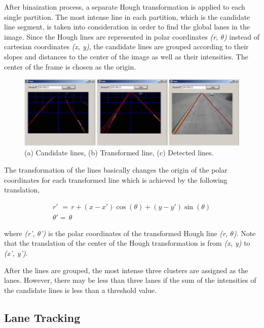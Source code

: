 \documentclass[a4paper,oneside,10pt]{article}
\begin{document}
After binaization process, a separate Hough transformation is applied to each single partition. The most intense line in each partition, which is the candidate line segment, is taken into consideration in order to find the global lanes in the image. Since the Hough lines are represented in polar coordinates \textit{(r, $\theta $)} instead of cartesian coordinates \textit{(x, y)}, the candidate lines are grouped according to their slopes and distances to the center of the image as well as their intensities. The center of the frame is chosen as the origin. 

\begin{figure}
\begin{center}
\includegraphics[scale=0.5]{fig2}
\end{center}
\caption{(a) Candidate lines, (b) Transformed line, (c) Detected lines.}
\label{aba:fig2}
\end{figure} 

The transformation of the lines basically changes the origin of the polar coordinates for each transformed line which is achieved by the following translation,

\begin{equation} \label{GrindEQ__1_} 
\begin{array}{l} {r'\, \, =\, r+(x-x')\cos (\theta )+(y-y')\sin (\theta )} \\ {\theta '=\, \theta } \end{array} 
\end{equation} 


\noindent where \textit{(r', $\theta $')} is the polar coordinates of the transformed Hough line \textit{(r, $\theta $)}. Note that the translation of the center of the Hough transformation is from \textit{(x, y)} to \textit{(x', y')}. 

After the lines are grouped, the most intense three clusters are assigned as the lanes. However, there may be less than three lanes if the sum of the intensities of the candidate lines is less than a threshold value.


\subsection{Lane Tracking}
\end{document}
